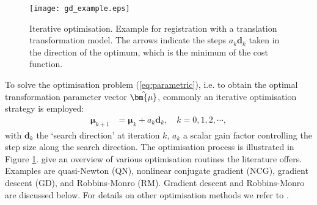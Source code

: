 \documentclass[]{report}
\newcommand{\vmu}{\bm{\mu}}
\begin{document}
\begin{figure}[tb]
\centering
\texttt{[image: gd\_example.eps]}
\caption{Iterative optimisation. Example for registration with a
translation transformation model. The arrows indicate the steps
$a_k \bm{d}_k$ taken in the direction of the optimum, which is the
minimum of the cost function.} \label{fig:optimisation}
\end{figure}
To solve the optimisation problem (\ref{eq:parametric}), i.e. to
obtain the optimal transformation parameter vector $\hat\vmu$,
commonly an iterative optimisation strategy is employed:
\begin{align}
\vmu_{k+1} &= \vmu_k + a_k \bm{d}_k, \quad k = 0, 1, 2, \cdots,
\end{align}
with $\bm{d}_k$ the `search direction' at iteration $k$, $a_k$ a
scalar gain factor controlling the step size along the search
direction. The optimisation process is illustrated in Figure
\ref{fig:optimisation}. \citet{KleinEA07} give an overview of
various optimisation routines the literature offers. Examples are
quasi-Newton (QN), nonlinear conjugate gradient (NCG), gradient
descent (GD), and Robbins-Monro (RM). Gradient descent and
Robbins-Monro are discussed below. For details on other
optimisation methods we refer to \citep{KleinEA07,NocedalEA99}.
\end{document}
